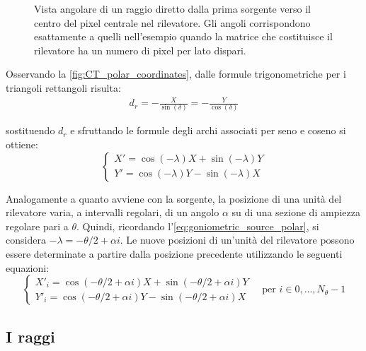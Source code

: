 \documentclass[12pt,a4paper]{report}
\begin{document}
\begin{figure}[H]
{
  }
  \caption{\label{fig:CT_polar_coordinates} Vista angolare di un raggio diretto dalla prima sorgente verso il centro del pixel
           centrale nel rilevatore. Gli angoli corrispondono esattamente a quelli nell'esempio quando la matrice che costituisce
           il rilevatore ha un numero di pixel per lato dispari.}
\end{figure}

Osservando la \autoref{fig:CT_polar_coordinates}, dalle formule trigonometriche per i triangoli rettangoli risulta:
\begin{align*}
  d_r = -\frac{X}{\sin(\delta)} = -\frac{Y}{\cos(\delta)}
\end{align*}

sostituendo \(d_r\) e sfruttando le formule degli archi associati per seno e coseno si ottiene:
\begin{equation*}
  \begin{cases}
    X' = \cos(-\lambda) X + \sin(-\lambda) Y \\
    Y' = \cos(-\lambda) Y - \sin(-\lambda) X
  \end{cases}
\end{equation*}

Analogamente a quanto avviene con la sorgente, la posizione di una unità del rilevatore varia, a intervalli regolari, di
un angolo \(\alpha\) su di una sezione di ampiezza regolare pari a \(\theta\).
Quindi, ricordando l'\autoref{eq:goniometric_source_polar}, si considera \(-\lambda = -\theta/2 + \alpha i\).
Le nuove posizioni di un'unità del rilevatore possono essere determinate a partire dalla posizione precedente utilizzando le
seguenti equazioni:
\begin{equation*}
  \begin{cases}
    X'_i = \cos(-\theta/2 + \alpha i) X + \sin(-\theta/2 + \alpha i) Y \\
    Y'_i = \cos(-\theta/2 + \alpha i) Y - \sin(-\theta/2 + \alpha i) X
  \end{cases} \quad \text{per } i \in 0,\dots,N_\theta - 1
\end{equation*}

\subsection{I raggi}
\end{document}
